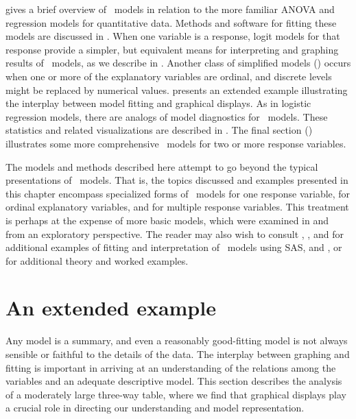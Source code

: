  gives a brief overview of \loglin\
models in relation to the more familiar ANOVA and regression models
for quantitative data.
Methods and software for fitting these models are discussed in 
.
When one variable is a response, logit models for that response provide
a simpler, but equivalent means for interpreting and graphing
results of \loglin\ models, as we describe in .
Another class of simplified models (\secref{sec:loglin-ordinal})
occurs when one or more of the explanatory variables are ordinal,
and discrete levels might be replaced by numerical values.
 presents an extended example illustrating
the interplay between model fitting and graphical displays.
As in logistic regression models, there are analogs of
model diagnostics for \loglin\ models.
These statistics  and related visualizations are described in
.
The final section () illustrates some
more comprehensive \loglin\ models for two or more response variables.

The models and methods described here attempt to go beyond the typical
presentations of \loglin\ models.   That is, the topics discussed
and examples presented in this chapter
encompass specialized forms of \loglin\ models
for one response variable, for ordinal explanatory variables, and for
multiple response variables.  This treatment is perhaps at the expense of more
basic models, which were examined in \chref{ch:mosaic} and \chref{ch:corresp}
from an exploratory perspective.
The reader may also wish to consult ,
\citet[]{Allison:99}, and
\citet[--5]{Zelterman:99} for additional examples of fitting and
interpretation of \loglin\ models using SAS,
and \citet[--8]{Agresti:90}, or \citet{Christensen:97}
for additional theory and worked examples.







\section{An extended example}\label{sec:loglin-vietnam}
Any model is a summary, and even a reasonably good-fitting model is not always sensible or faithful to the details of the data.
The interplay between graphing and fitting is important in arriving at
an understanding of the relations among the variables
and an adequate descriptive model.
This section describes the analysis of a moderately large three-way
table, where we find that graphical displays play a crucial role
in directing our understanding and model representation.

